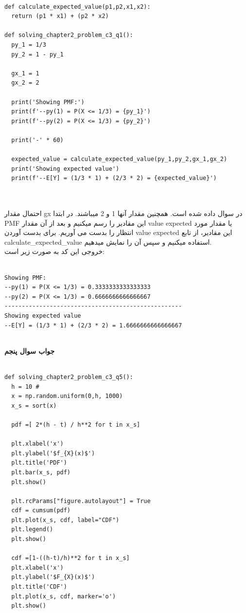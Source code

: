 \documentclass[a4paper,14pt]{article}
\begin{document}
		\fontsize{11}{11}\selectfont
\begin{latin}
	\begin{lstlisting}
		
def calculate_expected_value(p1,p2,x1,x2):
  return (p1 * x1) + (p2 * x2)

def solving_chapter2_problem_c3_q1():
  py_1 = 1/3
  py_2 = 1 - py_1

  gx_1 = 1
  gx_2 = 2

  print('Showing PMF:')
  print(f'--py(1) = P(X <= 1/3) = {py_1}')
  print(f'--py(2) = P(X <= 1/3) = {py_2}')

  print('-' * 60)

  expected_value = calculate_expected_value(py_1,py_2,gx_1,gx_2)
  print('Showing expected value')
  print(f'--E[Y] = (1/3 * 1) + (2/3 * 2) = {expected_value}')
		
		
	\end{lstlisting}
\end{latin}
\fontsize{14}{14}\selectfont


احتمال مقدار gx در سوال داده شده است. همچنین مقدار آنها 1 و 2 میباشند. در ابتدا PMF این مقادیر را رسم میکنیم و بعد از آن مقدار value expected یا مقدار مورد انتظار را بدست می آوریم. برای بدست آوردن value expected این مقادیر، از تابع calculate\_expected\_value استفاده میکنیم و سپس آن را نمایش میدهیم.\\

خروجی این کد به صورت زیر است:\\


\begin{latin}
	\begin{lstlisting}
		
Showing PMF:
--py(1) = P(X <= 1/3) = 0.3333333333333333
--py(2) = P(X <= 1/3) = 0.6666666666666667
---------------------------------------------------
Showing expected value
--E[Y] = (1/3 * 1) + (2/3 * 2) = 1.6666666666666667
		
	\end{lstlisting}
\end{latin}

\textbf{جواب سوال پنجم}\\


		\fontsize{11}{11}\selectfont
\begin{latin}
	\begin{lstlisting}
		
def solving_chapter2_problem_c3_q5():
  h = 10 #
  x = np.random.uniform(0,h, 1000)
  x_s = sort(x)

  pdf =[ 2*(h - t) / h**2 for t in x_s]

  plt.xlabel('x')
  plt.ylabel('$f_{X}(x)$')
  plt.title('PDF')
  plt.bar(x_s, pdf)
  plt.show()

  plt.rcParams["figure.autolayout"] = True
  cdf = cumsum(pdf)
  plt.plot(x_s, cdf, label="CDF")
  plt.legend()
  plt.show()

  cdf =[1-((h-t)/h)**2 for t in x_s]
  plt.xlabel('x')
  plt.ylabel('$F_{X}(x)$')
  plt.title('CDF')
  plt.plot(x_s, cdf, marker='o')
  plt.show()
		
		
	\end{lstlisting}
\end{latin}
\fontsize{14}{14}\selectfont
\end{document}
